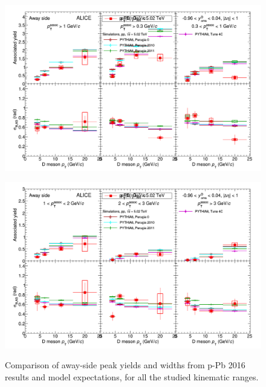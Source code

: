 \begin{figure}[!htbp]
\centering
{\includegraphics[width=1.3\linewidth, angle=90]{figures/CfrPPandModels/ComparePPbtoMCFitResultsAS.png}}
\end{figure}
\begin{figure}[!htbp]
\centering
{\includegraphics[width=1.3\linewidth, angle=90]{figures/CfrPPandModels/ComparePPbtoMCFitResultsAS_2.png}}
\caption{Comparison of away-side peak yields and widths from p-Pb 2016 results and model expectations, for all the studied kinematic ranges.}
\label{fig:CfrAverageModel2}
\end{figure}
